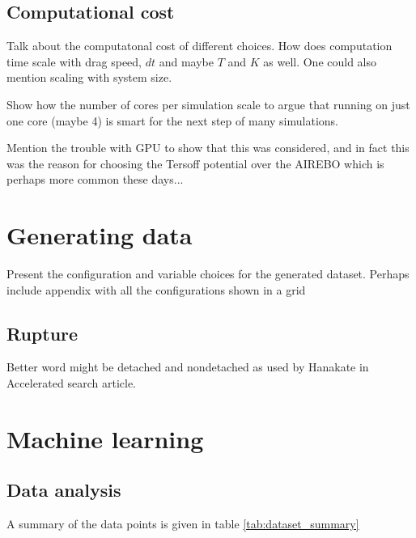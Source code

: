 \section{Computational cost}

Talk about the computatonal cost of different choices. How does computation time scale with drag speed, $dt$ and maybe $T$ and $K$ as well. One could also mention scaling with system size.

Show how the number of cores per simulation scale to argue that running on just one core (maybe 4) is smart for the next step of many simulations. 

Mention the trouble with GPU to show that this was considered, and in fact this was the reason for choosing the Tersoff potential over the AIREBO which is perhaps more common these days...



\chapter{Generating data}

Present the configuration and variable choices for the generated dataset. Perhaps include appendix with all the configurations shown in a grid


\section{Rupture}
Better word might be detached and nondetached as used by Hanakate in Accelerated search article.

\chapter{Machine learning}
\section{Data analysis}
A summary of the data points is given in table \ref{tab:dataset_summary}

